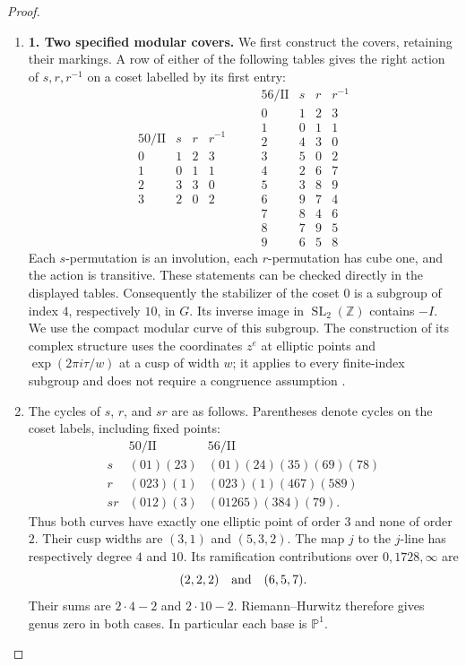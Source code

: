 \begin{proof}
\begin{enumerate}[label=\arabic*.,leftmargin=*]
\item \par\medskip\noindent\textbf{1. Two specified modular covers.}\quad 
We first construct the covers, retaining their markings.  A row of
either of the following tables gives the right action of $s,r,r^{-1}$
on a coset labelled by its first entry:
\[
\begin{array}{c|rrr}
50/\mathrm{II}&s&r&r^{-1}\\\hline
0&1&2&3\\1&0&1&1\\2&3&3&0\\3&2&0&2
\end{array}
\qquad
\begin{array}{c|rrr}
56/\mathrm{II}&s&r&r^{-1}\\\hline
0&1&2&3\\1&0&1&1\\2&4&3&0\\3&5&0&2\\
4&2&6&7\\5&3&8&9\\6&9&7&4\\7&8&4&6\\
8&7&9&5\\9&6&5&8
\end{array}
\]
Each $s$-permutation is an involution, each $r$-permutation has cube
one, and the action is transitive.  These statements can be checked
directly in the displayed tables.  Consequently the stabilizer of
the coset $0$ is a subgroup of index $4$, respectively $10$, in $G$.
Its inverse image in $\operatorname{SL}_2(\mathbb Z)$ contains $-I$.
We use the compact modular curve of this subgroup.  The construction
of its complex structure uses the coordinates $z^e$ at elliptic
points and $\exp(2\pi i\tau/w)$ at a cusp of width $w$;
it applies to every finite-index subgroup and does not require a
congruence assumption \cite[pp.~35--38]{mapsMilne2017}.

\item The cycles of $s$, $r$, and $sr$ are as follows.  Parentheses denote
cycles on the coset labels, including fixed points:
\[
\begin{array}{c|l|l}
&50/\mathrm{II}&56/\mathrm{II}\\\hline
s&(01)(23)&(01)(24)(35)(69)(78)\\
r&(023)(1)&(023)(1)(467)(589)\\
sr&(012)(3)&(01265)(384)(79).
\end{array}
\]
Thus both curves have exactly one elliptic point of order $3$ and
none of order $2$.  Their cusp widths are $(3,1)$ and $(5,3,2)$.
The map $j$ to the $j$-line has respectively degree $4$ and $10$.
Its ramification contributions over $0,1728,\infty$ are
\[
 (2,2,2)\quad\hbox{and}\quad(6,5,7).
\]
Their sums are $2\cdot4-2$ and $2\cdot10-2$.  Riemann--Hurwitz
therefore gives genus zero in both cases.  In particular each base
is $\mathbb P^1$.


\end{enumerate}
\end{proof}

